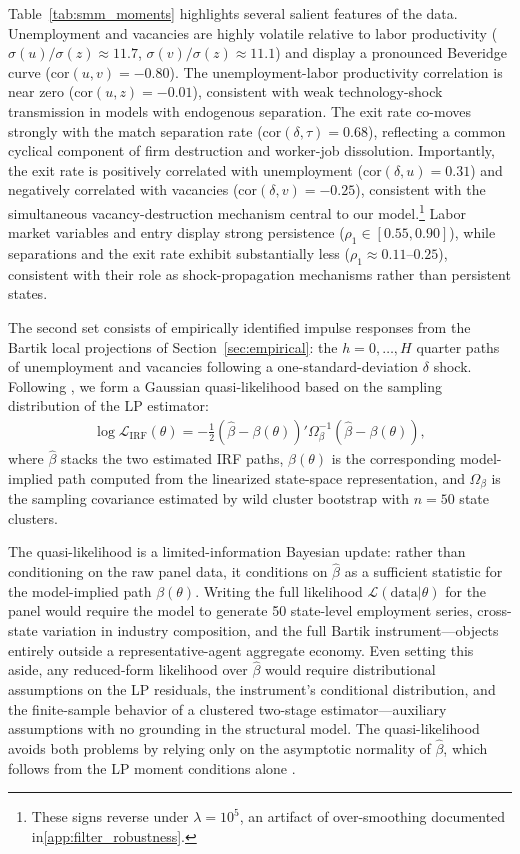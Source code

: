 \documentclass[authoryear, review, 12pt]{elsarticle}
\begin{document}
Table~\ref{tab:smm_moments} highlights several salient features of the data.
Unemployment and vacancies are highly volatile relative to labor productivity
($\sigma(u)/\sigma(z) \approx 11.7$, $\sigma(v)/\sigma(z) \approx 11.1$) and
display a pronounced Beveridge curve ($\text{cor}(u,v)=-0.80$).  The
unemployment-labor productivity correlation is near zero ($\text{cor}(u,z)=-0.01$),
consistent with weak technology-shock transmission in models with endogenous
separation.  The exit rate co-moves strongly with the match separation rate
($\text{cor}(\delta,\tau)=0.68$), reflecting a common cyclical component of firm
destruction and worker-job dissolution.  Importantly, the exit rate is positively
correlated with unemployment ($\text{cor}(\delta,u)=0.31$) and negatively correlated
with vacancies ($\text{cor}(\delta,v)=-0.25$), consistent with the simultaneous
vacancy-destruction mechanism central to our model.\footnote{These signs reverse under
$\lambda=10^5$, an artifact of over-smoothing
documented in\ref{app:filter_robustness}.}  Labor market variables and
entry display strong persistence ($\rho_1 \in [0.55, 0.90]$), while separations
and the exit rate exhibit substantially less ($\rho_1 \approx 0.11$--$0.25$),
consistent with their role as shock-propagation mechanisms rather than persistent states.


The second set consists of empirically identified impulse responses from the
	Bartik local projections of Section~\ref{sec:empirical}: the $h=0,\ldots,H$
	quarter paths of unemployment and vacancies following a one-standard-deviation
	$\delta$ shock. Following \citet{christiano_2016}, we form a Gaussian
	quasi-likelihood based on the sampling distribution of the LP estimator:
	\begin{align}\label{eq:ql_irf}
		\log \mathcal{L}_{\mathrm{IRF}}(\theta)
		= -\tfrac{1}{2}(\hat\beta - \beta(\theta))'\Omega_\beta^{-1}(\hat\beta -
		\beta(\theta)),
	\end{align}
	where $\hat\beta$ stacks the two estimated IRF paths, $\beta(\theta)$ is the
	corresponding model-implied path computed from the linearized state-space
	representation, and $\Omega_\beta$ is the sampling covariance estimated by wild
	cluster bootstrap with $n=50$ state clusters.

	The quasi-likelihood is a limited-information Bayesian update: rather than
	conditioning on the raw panel data, it conditions on $\hat\beta$ as a sufficient
	statistic for the model-implied path $\beta(\theta)$. 
	Writing the full likelihood $\mathcal{L}(\mathrm{data}|\theta)$ for the panel
	would require the model to generate 50 state-level employment series, cross-state
	variation in industry composition, and the full Bartik instrument---objects entirely
	outside a representative-agent aggregate economy.  Even setting this aside, any
	reduced-form likelihood over $\hat\beta$ would require distributional assumptions
	on the LP residuals, the instrument's conditional distribution, and the
	finite-sample behavior of a clustered two-stage estimator---auxiliary assumptions
	with no grounding in the structural model.  The quasi-likelihood avoids both
	problems by relying only on the asymptotic normality of $\hat\beta$, which
	follows from the LP moment conditions alone \citep{chernozhukov_2003}.
\end{document}
